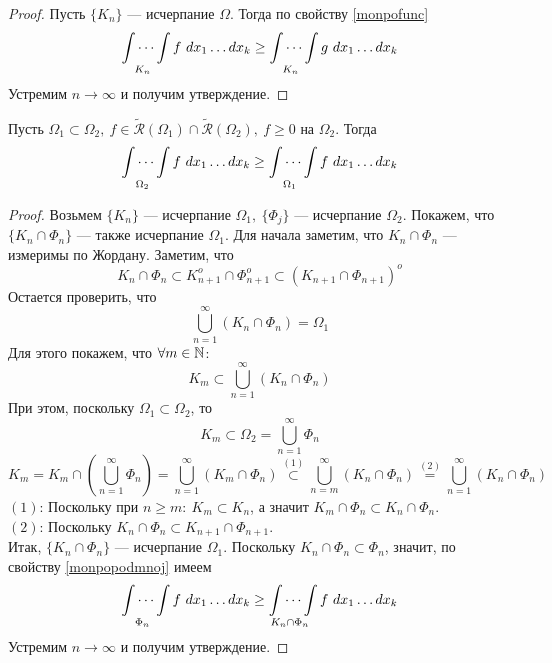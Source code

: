 \begin{proof}
    Пусть $\{K_n\}$ --- исчерпание $\Omega$. Тогда по свойству \ref{monpofunc}
    \[\idotsint\limits_{K_n}f\ dx_1\dots dx_k\geq \idotsint\limits_{K_n}g\ dx_1\dots dx_k\]
    Устремим $n\to \infty$ и получим утверждение.
\end{proof}
\begin{statement}\label{l12.5}
    Пусть $\Omega_1\subset \Omega_2,\ f\in \widetilde{\mathcal{R}}(\Omega_1)\cap \widetilde{\mathcal{R}}(\Omega_2),\ f\geq 0$ на $\Omega_2$. Тогда
    \[\idotsint\limits_{\Omega_2}f\ dx_1 \dots dx_k\geq \idotsint\limits_{\Omega_1}f\ dx_1 \dots dx_k\]
\end{statement}
\begin{proof}
    Возьмем $\{K_n\}$ --- исчерпание $\Omega_1,\ \{\Phi_j\}$ --- исчерпание $\Omega_2$. Покажем, что $\{K_n\cap \Phi_n\}$ --- также исчерпание $\Omega_1$. Для начала заметим, что $K_n\cap \Phi_n$ --- измеримы по Жордану. Заметим, что
    \[K_n\cap \Phi_n\subset K^o_{n+1}\cap \Phi^o_{n+1}\subset (K_{n+1}\cap \Phi_{n+1})^o\]
    Остается проверить, что 
    \[\bigcup\limits_{n=1}^{\infty}(K_n\cap \Phi_n)=\Omega_1\]
    Для этого покажем, что $\forall m\in \mathbb{N}$:
    \[K_m\subset \bigcup\limits_{n=1}^{\infty}(K_n\cap \Phi_n)\]
    При этом, поскольку $\Omega_1\subset \Omega_2$, то
    \[K_m\subset \Omega_2=\bigcup\limits_{n=1}^{\infty}\Phi_n\]
    \[K_m=K_m\cap\left(\bigcup\limits_{n=1}^{\infty}\Phi_n\right)=\bigcup\limits_{n=1}^{\infty}(K_m\cap \Phi_n)\overset{(1)}{\subset} \bigcup\limits_{n=m}^{\infty}(K_n\cap \Phi_n)\overset{(2)}{=}\bigcup\limits_{n=1}^{\infty}(K_n\cap \Phi_n)\]
    $(1)$: Поскольку при $n\geq m:\ K_m\subset K_n$, а значит $K_m\cap \Phi_n\subset K_n\cap \Phi_n$.\\
    $(2)$: Поскольку $K_n\cap\Phi_n\subset K_{n+1}\cap \Phi_{n+1}$.\\
    Итак, $\{K_n\cap\Phi_n\}$ --- исчерпание $\Omega_1$. Поскольку $K_n\cap \Phi_n\subset \Phi_n$, значит, по свойству \ref{monpopodmnoj} имеем
    \[\idotsint\limits_{\Phi_n}f\ dx_1\dots dx_k\geq \idotsint\limits_{K_n\cap\Phi_n}f\ dx_1 \dots dx_k\]
    Устремим $n\to \infty$ и получим утверждение.
\end{proof}
